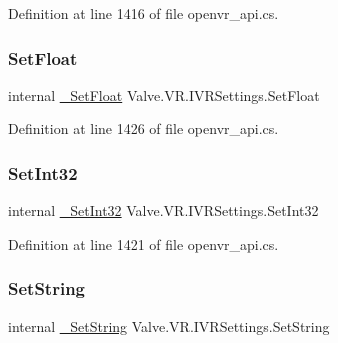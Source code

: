 Definition at line 1416 of file openvr\+\_\+api.\+cs.

\mbox{\label{struct_valve_1_1_v_r_1_1_i_v_r_settings_a5469466b1a73b396fb85a0809db0afb2}} 
\subsubsection{\texorpdfstring{SetFloat}{SetFloat}}
{\footnotesize\ttfamily internal \mbox{\hyperlink{struct_valve_1_1_v_r_1_1_i_v_r_settings_ad61118d96d4ec60b78250dcb93fae065}{\+\_\+\+Set\+Float}} Valve.\+V\+R.\+I\+V\+R\+Settings.\+Set\+Float}



Definition at line 1426 of file openvr\+\_\+api.\+cs.

\mbox{\label{struct_valve_1_1_v_r_1_1_i_v_r_settings_ab446d5d72dac346df7260e53259e140d}} 
\subsubsection{\texorpdfstring{SetInt32}{SetInt32}}
{\footnotesize\ttfamily internal \mbox{\hyperlink{struct_valve_1_1_v_r_1_1_i_v_r_settings_ae73ed83147f47177ed5d90efe0acd8bd}{\+\_\+\+Set\+Int32}} Valve.\+V\+R.\+I\+V\+R\+Settings.\+Set\+Int32}



Definition at line 1421 of file openvr\+\_\+api.\+cs.

\mbox{\label{struct_valve_1_1_v_r_1_1_i_v_r_settings_a78cd3742a50cdf29ceac475413adfcc4}} 
\subsubsection{\texorpdfstring{SetString}{SetString}}
{\footnotesize\ttfamily internal \mbox{\hyperlink{struct_valve_1_1_v_r_1_1_i_v_r_settings_a9609f80e0c236c65db99bcd997c0145b}{\+\_\+\+Set\+String}} Valve.\+V\+R.\+I\+V\+R\+Settings.\+Set\+String}



